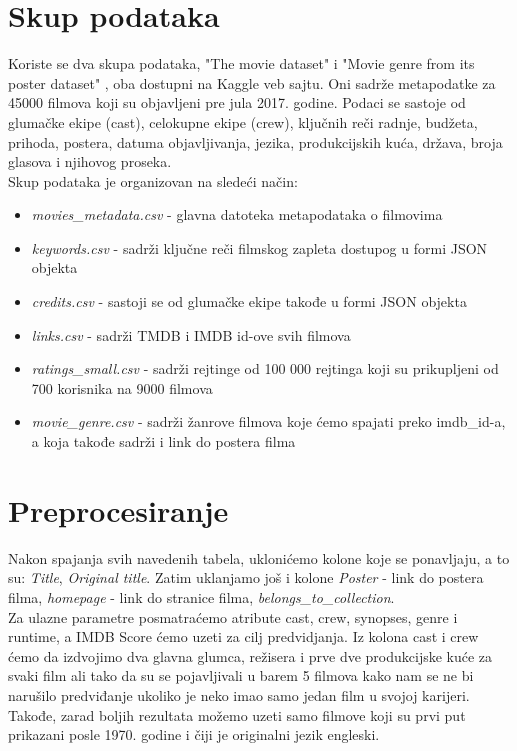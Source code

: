 \documentclass[a4paper]{article}
\begin{document}
\section{Skup podataka}
\label{sec:skupPodataka}

Koriste se dva skupa podataka, "The movie dataset" \cite{movieDataset} i "Movie genre from its poster dataset" \cite{movieGenres}, oba dostupni na Kaggle \cite{kaggle} veb sajtu. Oni sadrže metapodatke za 45000 filmova koji su objavljeni pre jula 2017. godine. Podaci se sastoje od glumačke ekipe (cast), celokupne ekipe (crew), ključnih reči radnje, budžeta, prihoda, postera, datuma objavljivanja, jezika, produkcijskih kuća, država, broja glasova i njihovog proseka.\\

Skup podataka je organizovan na sledeći način:
\begin{itemize}
	\item \textit{movies\_metadata.csv} - glavna datoteka metapodataka o filmovima
	\item \textit{keywords.csv} - sadrži ključne reči filmskog zapleta dostupog u formi JSON objekta
	\item \textit{credits.csv} - sastoji se od glumačke ekipe takođe u formi JSON objekta
	\item \textit{links.csv} - sadrži TMDB i IMDB id-ove svih filmova
	\item \textit{ratings\_small.csv} - sadrži rejtinge od 100 000 rejtinga koji su prikupljeni od 700 korisnika na 9000 filmova
	\item \textit{movie\_genre.csv} - sadrži žanrove filmova koje ćemo spajati preko imdb\_id-a, a koja takođe sadrži i link do postera filma
\end{itemize}


\section{Preprocesiranje}
\label{sec:preprocesiranje}

Nakon spajanja svih navedenih tabela, uklonićemo kolone koje se ponavljaju, a to su: \textit{Title}, \textit{Original title}. Zatim uklanjamo još i kolone \textit{Poster} - link do postera filma, \textit{homepage} - link do stranice filma, \textit{belongs\_to\_collection}.\\

Za ulazne parametre posmatraćemo atribute cast, crew, synopses, genre i runtime, a IMDB Score ćemo uzeti za cilj predvidjanja. Iz kolona cast i crew ćemo da izdvojimo dva glavna glumca, režisera i prve dve produkcijske kuće za svaki film ali tako da su se pojavljivali u barem 5 filmova kako nam se ne bi narušilo predviđanje ukoliko je neko imao samo jedan film u svojoj karijeri. Takođe, zarad boljih rezultata možemo uzeti samo filmove koji su prvi put prikazani posle 1970. godine i čiji je originalni jezik engleski.\\
\end{document}
